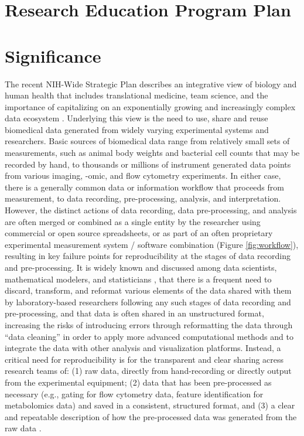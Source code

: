 \documentclass[pdftex,english,11pt,parskip=half]{scrartcl}
\begin{document}
\def\bf{\normalfont\bfseries}
\pagestyle{empty}

\section*{Research Education Program Plan}

\section{Significance}
\vspace{-0.1in}

The recent NIH-Wide Strategic Plan \cite{nih2016strategic} describes an
integrative view of biology and human health that includes translational
medicine, team science, and the importance of capitalizing on an exponentially 
growing and increasingly complex data ecosystem \cite{nih2018data}.  Underlying 
this view is the need to use, share and reuse biomedical data generated from widely 
varying experimental systems and researchers. Basic sources of biomedical data range 
from relatively small sets of measurements, such as animal body weights and bacterial 
cell counts that may be recorded by hand, to thousands or millions of instrument generated 
data points from various imaging, -omic, and flow cytometry experiments. In either case, 
there is a generally common data or information workflow that proceeds 
from measurement, to data recording, pre-processing, analysis, and interpretation.  However, the distinct actions of data recording, data pre-processing, and analysis 
are often merged or combined as a single entity by the researcher using commercial or open 
source spreadsheets, or as part of an often proprietary experimental measurement 
system / software combination (Figure \ref{fig:workflow}), resulting in key failure points for reproducibility at the stages of data recording and pre-processing.  It is widely 
known and discussed among data scientists, mathematical modelers, and statisticians 
\cite{broman2018data, krishnan2016towards}, that there is a frequent need to discard, 
transform, and reformat various elements of the data shared with them by laboratory-based researchers following any such stages of data recording and pre-processing, and that data is often shared in an unstructured format, increasing the risks of introducing errors through reformatting the data through ``data cleaning'' in order to apply more advanced computational methods
and to integrate the data with other analysis and visualization platforms. Instead, a critical need for reproducibility is for the transparent and clear sharing acress research teams of: (1) raw data, directly from hand-recording or directly output from the experimental equipment; (2) data that has been pre-processed as necessary (e.g., gating for flow cytometry data, feature identification for metabolomics data) and saved in a consistent, structured format, and (3) a clear and repeatable description of how the pre-processed data was generated from the raw data \cite{broman2018data, ellis2018share}.
\end{document}
